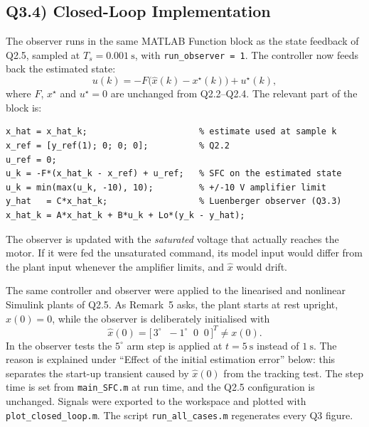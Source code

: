 \documentclass[11pt,a4paper]{article}
\begin{document}
\subsection*{Q3.4) Closed-Loop Implementation}
The observer runs in the same MATLAB Function block as the state feedback of
Q2.5, sampled at $T_s=0.001~\mathrm s$, with \texttt{run\_observer = 1}. The
controller now feeds back the estimated state:
\begin{equation}\label{eq:sfc_obs}
  u(k)=-F\bigl(\hat{x}(k)-x^\star(k)\bigr)+u^\star(k),
\end{equation}
where $F$, $x^\star$ and $u^\star=0$ are unchanged from Q2.2--Q2.4. The
relevant part of the block is:
\begin{lstlisting}
x_hat = x_hat_k;                      % estimate used at sample k
x_ref = [y_ref(1); 0; 0; 0];          % Q2.2
u_ref = 0;
u_k = -F*(x_hat_k - x_ref) + u_ref;   % SFC on the estimated state
u_k = min(max(u_k, -10), 10);         % +/-10 V amplifier limit
y_hat   = C*x_hat_k;                  % Luenberger observer (Q3.3)
x_hat_k = A*x_hat_k + B*u_k + Lo*(y_k - y_hat);
\end{lstlisting}
The observer is updated with the \emph{saturated} voltage that actually reaches
the motor. If it were fed the unsaturated command, its model input would differ
from the plant input whenever the amplifier limits, and $\hat x$ would drift.

The same controller and observer were applied to the linearised and nonlinear
Simulink plants of Q2.5. As Remark~5 asks, the plant starts at rest upright,
$x(0)=0$, while the observer is deliberately initialised with
\begin{equation}
  \hat{x}(0)=\bigl[\,3^\circ\;\;-1^\circ\;\;0\;\;0\,\bigr]^{T}\neq x(0).
\end{equation}
In the observer tests the $5^\circ$ arm step is applied at $t=5~\mathrm s$
instead of $1~\mathrm s$. The reason is explained under ``Effect of the initial
estimation error'' below: this separates the start-up transient caused by
$\hat x(0)$ from the tracking test. The step time is set from
\texttt{main\_SFC.m} at run time, and the Q2.5 configuration is unchanged.
Signals were exported to the workspace and plotted with
\texttt{plot\_closed\_loop.m}. The script \texttt{run\_all\_cases.m}
regenerates every Q3 figure.
\end{document}
